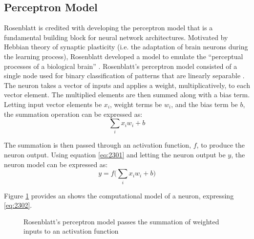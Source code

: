 \subsection{Perceptron Model}
Rosenblatt is credited with developing the perceptron model that is a fundamental building block for neural network architectures. Motivated by Hebbian theory of synaptic plasticity (i.e. the adaptation of brain neurons during the learning process), Rosenblatt developed a model to emulate the ``perceptual processes of a biological brain'' \cite{Rosenblatt1957}. Rosenblatt's perceptron model consisted of a single node used for binary classification of patterns that are linearly separable \cite{Rosenblatt1958}. The neuron takes a vector of inputs and applies a weight, multiplicatively, to each vector element. The multiplied elements are then summed along with a bias term. Letting input vector elements be $x_i$, weight terms be $w_i$, and the bias term be $b$, the summation operation can be expressed as:
\begin{equation}
	\sum_{i}x_i w_i + b \label{eq:2301}
\end{equation} 

The summation is then passed through an activation function, $f$, to produce the neuron output. Using equation \ref{eq:2301} and letting the neuron output be $y$, the neuron model can be expressed as:
\begin{equation}
	y = f\bigg( \sum_{i}x_i w_i + b \bigg) \label{eq:2302}
\end{equation}

Figure \ref{fig:2301_perceptron_model} provides an shows the computational model of a neuron, expressing \ref{eq:2302}.

\begin{figure}[h]
	\centering
	
	\caption[Computational model of a perceptron]{Rosenblatt's perceptron model passes the summation of weighted inputs to an activation function}
	\label{fig:2301_perceptron_model}
\end{figure}



